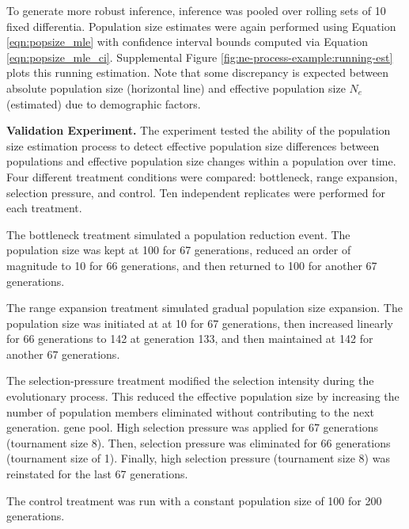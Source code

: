 To generate more robust inference, inference was pooled over rolling sets of 10 fixed differentia.
Population size estimates were again performed using Equation \ref{eqn:popsize_mle} with confidence interval bounds computed via Equation \ref{eqn:popsize_mle_ci}.
Supplemental Figure \ref{fig:ne-process-example:running-est} plots this running estimation.
Note that some discrepancy is expected between absolute population size (horizontal line) and effective population size $N_e$ (estimated) due to demographic factors.

\textbf{Validation Experiment.}
The experiment tested the ability of the population size estimation process to detect effective population size differences between populations and effective population size changes within a population over time.
Four different treatment conditions were compared: bottleneck, range expansion, selection pressure, and control.
Ten independent replicates were performed for each treatment.

The bottleneck treatment simulated a population reduction event.
The population size was kept at 100 for 67 generations, reduced an order of magnitude to 10 for 66 generations, and then returned to 100 for another 67 generations.

The range expansion treatment simulated gradual population size expansion.
The population size was initiated at at 10 for 67 generations, then increased linearly for 66 generations to 142 at generation 133, and then maintained at 142 for another 67 generations.

The selection-pressure treatment modified the selection intensity during the evolutionary process.
This reduced the effective population size by increasing the number of population members eliminated without contributing to the next generation. gene pool.
High selection pressure was applied for 67 generations (tournament size 8). Then, selection pressure was eliminated for 66 generations (tournament size of 1).
Finally, high selection pressure (tournament size 8) was reinstated for the last 67 generations.

The control treatment was run with a constant population size of 100 for 200 generations.

